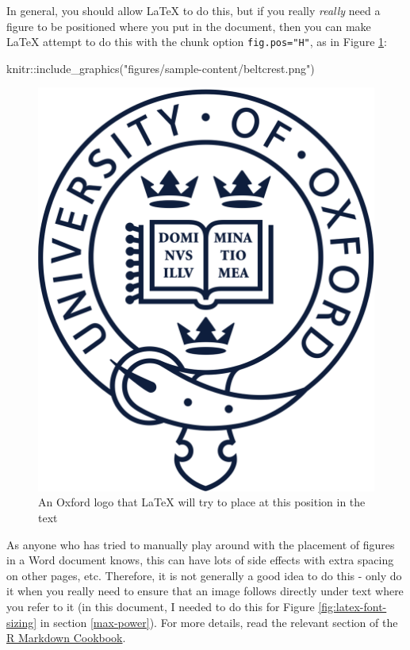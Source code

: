 \documentclass[a4paper, twoside]{templates/ociamthesis}
\newenvironment{Shaded}{\begin{snugshade}}{\end{snugshade}}
\newcommand{\FunctionTok}[1]{\textcolor[rgb]{0.00,0.00,0.00}{#1}}
\newcommand{\NormalTok}[1]{#1}
\newcommand{\SpecialCharTok}[1]{\textcolor[rgb]{0.00,0.00,0.00}{#1}}
\newcommand{\StringTok}[1]{\textcolor[rgb]{0.31,0.60,0.02}{#1}}
\renewenvironment{Shaded}
{
  \vspace{10pt}%
  \begin{snugshade}%
}{%
  \end{snugshade}%
  \vspace{8pt}%
}
\begin{document}
In general, you should allow LaTeX to do this, but if you really \emph{really} need a figure to be positioned where you put in the document, then you can make LaTeX attempt to do this with the chunk option \texttt{fig.pos="H"}, as in Figure \ref{fig:oxford-logo-controlled}:

\begin{Shaded}
\begin{Highlighting}[]
\NormalTok{knitr}\SpecialCharTok{::}\FunctionTok{include\_graphics}\NormalTok{(}\StringTok{"figures/sample{-}content/beltcrest.png"}\NormalTok{)}
\end{Highlighting}
\end{Shaded}

\begin{figure}[H]

{\centering \includegraphics[width=0.5\linewidth]{figures/sample-content/beltcrest} 

}

\caption{An Oxford logo that LaTeX will try to place at this position in the text}\label{fig:oxford-logo-controlled}
\end{figure}

As anyone who has tried to manually play around with the placement of figures in a Word document knows, this can have lots of side effects with extra spacing on other pages, etc.
Therefore, it is not generally a good idea to do this - only do it when you really need to ensure that an image follows directly under text where you refer to it (in this document, I needed to do this for Figure \ref{fig:latex-font-sizing} in section \ref{max-power}).
For more details, read the relevant section of the \href{https://bookdown.org/yihui/rmarkdown-cookbook/figure-placement.html}{R Markdown Cookbook}.
\end{document}
